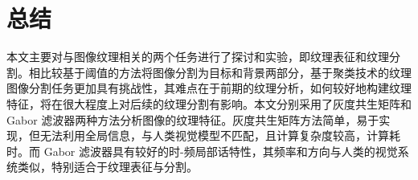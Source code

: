 \section{总结}
本文主要对与图像纹理相关的两个任务进行了探讨和实验，即纹理表征和纹理分割。相比较基于阈值的方法将图像分割为目标和背景两部分，基于聚类技术的纹理图像分割任务更加具有挑战性，其难点在于前期的纹理分析，如何较好地构建纹理特征，将在很大程度上对后续的纹理分割有影响。本文分别采用了灰度共生矩阵和 Gabor 滤波器两种方法分析图像的纹理特征。灰度共生矩阵方法简单，易于实现，但无法利用全局信息，与人类视觉模型不匹配，且计算复杂度较高，计算耗时。而 Gabor 滤波器具有较好的时-频局部话特性，其频率和方向与人类的视觉系统类似，特别适合于纹理表征与分割。

